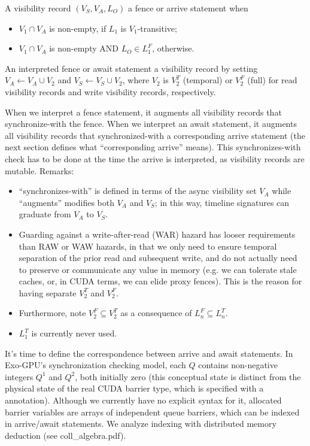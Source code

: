 \filbreak
A visibility record $(V_S, V_A, L_O)$  a fence or arrive statement when
\begin{itemize}
  \item $V_1 \cap V_A$ is non-empty, if $L_1$ is $V_1$-transitive;
  \filbreak
  \item $V_1 \cap V_A$ is non-empty AND $L_O \in L_1^F$, otherwise.
\end{itemize}
\filbreak

\filbreak
An interpreted fence or await statement  a visibility record by setting $V_A \leftarrow V_A \cup V_2$ and $V_S \leftarrow V_S \cup V_2$, where $V_2$ is $V_2^T$ (temporal) or $V_2^F$ (full) for read visibility records and write visibility records, respectively.

\filbreak
When we interpret a fence statement, it augments all visibility records that synchronize-with the fence.
When we interpret an await statement, it augments all visibility records that synchronized-with a corresponding arrive statement
(the next section defines what ``corresponding arrive'' means).
This synchronizes-with check has to be done at the time the arrive is interpreted, as visibility records are mutable.
Remarks:
\filbreak
\begin{itemize}
  \item ``synchronizes-with'' is defined in terms of the async visibility set $V_A$ while ``augments'' modifies both $V_A$ and $V_S$; in this way, timeline signatures can graduate from $V_A$ to $V_S$.
  \filbreak
  \item Guarding against a write-after-read (WAR) hazard has looser requirements than RAW or WAW hazards, in that we only need to ensure temporal separation of the prior read and subsequent write, and do not actually need to preserve or communicate any value in memory (e.g. we can tolerate stale caches, or, in CUDA terms, we can elide proxy fences).
  This is the reason for having separate $V_2^T$ and $V_2^F$.
  \filbreak
  \item Furthermore, note $V_2^F \subseteq V_2^T$ as a consequence of $L_n^F \subseteq L_n^T$.
  \filbreak
  \item $L_1^T$ is currently never used.
\end{itemize}

\newpage
{}
\label{ch:ArriveAwaitPairing}

It's time to define the correspondence between arrive and await statements.
In Exo-GPU's synchronization checking model, each  $Q$ contains non-negative integers  $Q^1$ and  $Q^2$, both initially zero (this conceptual state is distinct from the physical state of the real CUDA barrier type, which is specified with a  annotation).
Although we currently have no explicit syntax for it, allocated barrier variables are arrays of independent queue barriers, which can be indexed in arrive/await statements.
We analyze indexing with distributed memory deduction (see coll\_algebra.pdf).

